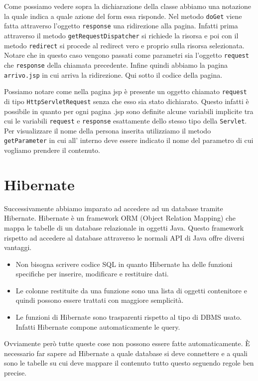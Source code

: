 \documentclass[12pt]{book}
\begin{document}
Come possiamo vedere sopra la dichiarazione della classe abbiamo una notazione
la quale indica a quale azione del form essa risponde.
Nel metodo \texttt{doGet} viene fatta attraverso l'oggetto \texttt{response}
una ridirezione alla pagina.
Infatti prima attraverso il metodo \texttt{getRequestDispatcher} si richiede
la risorsa e poi con il metodo \texttt{redirect} si procede al redirect vero
e proprio sulla risorsa selezionata.
Notare che in questo caso vengono passati come parametri sia l'oggetto 
\texttt{request} che \texttt{response} della chiamata precedente.
Infine quindi abbiamo la pagina \texttt{arrivo.jsp} in cui arriva la 
ridirezione.
Qui sotto il codice della pagina.

Possiamo notare come nella pagina jsp è presente un oggetto chiamato 
\texttt{request} di tipo \texttt{HttpServletRequest} senza che esso sia stato 
dichiarato.
Questo infatti è possibile in quanto per ogni pagina \@.jsp sono definite alcune
variabili implicite tra cui le variabili \texttt{request} e \texttt{response} 
esattamente dello stesso tipo della \texttt{Servlet}.
Per visualizzare il nome della persona inserita utilizziamo il metodo 
\texttt{getParameter} in cui all' interno deve essere indicato il nome del 
parametro di cui vogliamo prendere il contenuto.
\section{Hibernate}
Successivamente abbiamo imparato ad accedere ad un database tramite Hibernate.
Hibernate è un framework ORM (Object Relation Mapping) che mappa le tabelle 
di un database relazionale in oggetti Java.
Questo framework rispetto ad accedere al database attraverso le normali API 
di Java offre diversi vantaggi.
\begin{itemize}
    \item Non bisogna scrivere codice SQL in quanto Hibernate ha delle funzioni
       specifiche per inserire, modificare e restituire dati. 
    \item Le colonne restituite da una funzione sono una lista di oggetti 
        contenitore e quindi possono essere trattati con maggiore semplicità.
   \item Le funzioni di Hibernate sono trasparenti rispetto al tipo di DBMS 
       usato. Infatti Hibernate compone automaticamente le query.
\end{itemize}
Ovviamente però tutte queste cose non possono essere fatte automaticamente.
È necessario far sapere ad Hibernate a quale database si deve connettere e 
a quali sono le tabelle su cui deve mappare il contenuto tutto questo seguendo
regole ben precise.
\end{document}
